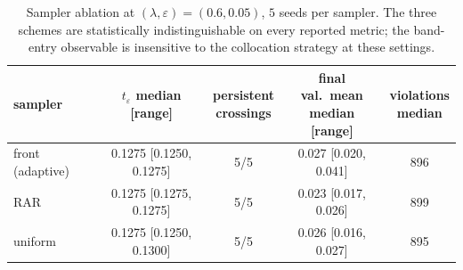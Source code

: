 \documentclass[11pt]{elsarticle}
\theoremstyle{definition}
\theoremstyle{remark}
\numberwithin{equation}{section}
\begin{document}
\begin{table}[htbp]
  \centering
  \small
  \setlength{\tabcolsep}{2.5pt}
  \begin{tabular}{lcccc}
    \toprule
    sampler &
    \shortstack{$t_\varepsilon$\\median [range]} &
    \shortstack{persistent\\crossings} &
    \shortstack{final val.\ mean\\median [range]} &
    \shortstack{violations\\median} \\
    \midrule
    front (adaptive) & 0.1275 [0.1250, 0.1275] & 5/5 & 0.027 [0.020, 0.041] & 896 \\
    RAR              & 0.1275 [0.1275, 0.1275] & 5/5 & 0.023 [0.017, 0.026] & 899 \\
    uniform          & 0.1275 [0.1250, 0.1300] & 5/5 & 0.026 [0.016, 0.027] & 895 \\
    \bottomrule
  \end{tabular}
  \caption{Sampler ablation at $(\lambda,\varepsilon)=(0.6,0.05)$, $5$
    seeds per sampler. The three schemes are statistically
    indistinguishable on every reported metric; the band-entry
    observable is insensitive to the collocation strategy at these
    settings.}
  \label{tab:relay-ablation}
\end{table}
\end{document}
